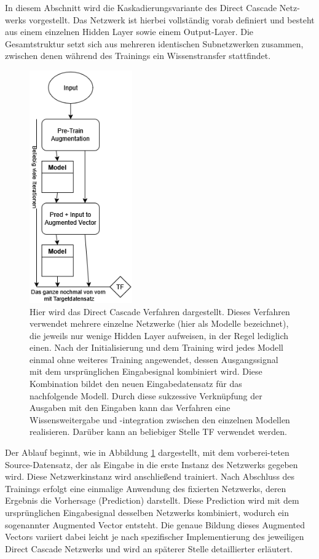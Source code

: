 In diesem Abschnitt wird die Kaskadierungsvariante des Direct Cascade Netz-werks vorgestellt. Das Netzwerk ist hierbei vollständig vorab 
definiert und besteht aus einem einzelnen Hidden Layer sowie einem Output-Layer. Die Gesamtstruktur setzt sich aus mehreren identischen 
Subnetzwerken zusammen, zwischen denen während des Trainings ein Wissenstransfer stattfindet.

\begin{figure}[htpb]
    \centering
    \includegraphics[height=10cm]{../../Graphiken/direct_cascade.png}
    \caption{\label{fig:directcascade} 
    \small{Hier wird das Direct Cascade Verfahren dargestellt. Dieses Verfahren verwendet mehrere einzelne Netzwerke 
    (hier als Modelle bezeichnet), die jeweils nur wenige Hidden Layer aufweisen, in der Regel lediglich einen. Nach der 
    Initialisierung und dem Training wird jedes Modell einmal ohne weiteres Training angewendet, dessen Ausgangssignal mit dem ursprünglichen 
    Eingabesignal kombiniert wird. Diese Kombination bildet den neuen Eingabedatensatz für das nachfolgende Modell. Durch diese sukzessive 
    Verknüpfung der Ausgaben mit den Eingaben kann das Verfahren eine Wissensweitergabe und -integration zwischen den einzelnen Modellen 
    realisieren. Darüber kann an beliebiger Stelle TF verwendet werden.}}
\end{figure}

Der Ablauf beginnt, wie in Abbildung \ref{fig:directcascade} dargestellt, mit dem vorberei-teten Source-Datensatz, der als 
Eingabe in die erste Instanz des Netzwerks gegeben wird. Diese Netzwerkinstanz wird anschließend trainiert. Nach Abschluss des Trainings 
erfolgt eine einmalige Anwendung des fixierten Netzwerks, deren Ergebnis die Vorhersage (Prediction) darstellt. Diese Prediction wird mit 
dem ursprünglichen Eingabesignal desselben Netzwerks kombiniert, wodurch ein sogenannter Augmented Vector entsteht. Die genaue Bildung dieses 
Augmented Vectors variiert dabei leicht je nach spezifischer Implementierung des jeweiligen Direct Cascade Netzwerks und wird an späterer 
Stelle detaillierter erläutert.

